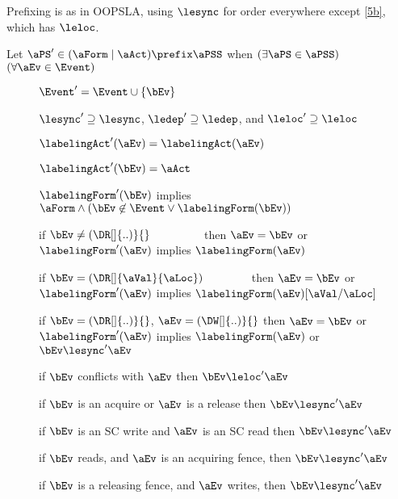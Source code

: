 Prefixing is as in OOPSLA, using $\lesync$ for order everywhere except
\ref{5b}, which has $\leloc$.
\begin{definition}
  Let $\aPS'\in(\aForm \mid \aAct) \prefix \aPSS$ when
  $(\exists\aPS\in\aPSS)$ $(\forall\aEv\in\Event)$
  \begin{description}
  \item[{}] $\Event' = \Event \cup \{\bEv\}$
  \item[{}] ${\lesync'}\supseteq{\lesync}$,
    ${\ledep'}\supseteq{\ledep}$, and ${\leloc'}\supseteq{\leloc}$
  \item[{}]%
    $\labelingAct'(\aEv) = \labelingAct(\aEv)$
  \item[{}] $\labelingAct'(\bEv) = \aAct$
  \item[{}]%
    $\labelingForm'(\bEv)$ implies
    $\aForm\land(\bEv\not\in\Event\lor\labelingForm(\bEv))$
  \item[{}] if $\bEv\neq(\DR[]{..)}{}\mkern79mu$
    then $\aEv=\bEv$ or $\labelingForm'(\aEv)$ implies $\labelingForm(\aEv)$
  \item[{}] if
    $\bEv=(\DR[]{\aVal}{\aLoc})\mkern70mu$ then $\aEv=\bEv$ or
    $\labelingForm'(\aEv)$ implies $\labelingForm(\aEv)[\aVal/\aLoc]$
  \item[{}]%
    if $\bEv=(\DR[]{..)}{}$, $\aEv=(\DW[]{..)}{}$ then $\aEv=\bEv$ or
    $\labelingForm'(\aEv)$ implies $\labelingForm(\aEv)$ or $\bEv\lesync'\aEv$
  \item[{}] if $\bEv$ conflicts with
    $\aEv$ %
    then $\bEv\leloc'\aEv$
  \item[{}] if $\bEv$ is an acquire or $\aEv$ is
    a release then $\bEv \lesync' \aEv$
  \item[{}] if $\bEv$ is an SC write and $\aEv$
    is an SC read then $\bEv \lesync' \aEv$
  \item[{}] if $\bEv$ reads, and $\aEv$ is an
    acquiring fence, then
    $\bEv \lesync' \aEv$
  \item[{}] if $\bEv$ is a releasing fence,
    and $\aEv$ writes, then
    $\bEv \lesync' \aEv$
  \end{description}
\end{definition}

